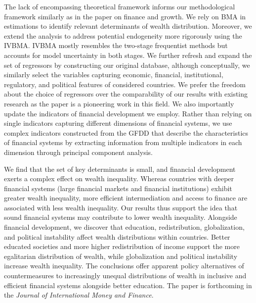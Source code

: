 \begin{refsection}
The lack of encompassing theoretical framework informs our methodological framework similarly as in the paper on finance and growth. We rely on \ac{BMA} in estimations to identify relevant determinants of wealth distribution. Moreover, we extend the analysis to address potential endogeneity more rigorously using the \ac{IVBMA}. \ac{IVBMA} mostly resembles the two-stage frequentist methods but accounts for model uncertainty in both stages. We further refresh and expand the set of regressors by constructing our original database, although conceptually, we similarly select the variables capturing economic, financial, institutional, regulatory, and political features of considered countries. We prefer the freedom about the choice of regressors over the comparability of our results with existing research as the paper is a pioneering work in this field. We also importantly update the indicators of financial development we employ. Rather than relying on single indicators capturing different dimensions of financial systems, we use complex indicators constructed from the \ac{GFDD} that describe the characteristics of financial systems by extracting information from multiple indicators in each dimension through principal component analysis.

We find that the set of key determinants is small, and financial development exerts a complex effect on wealth inequality. Whereas countries with deeper financial systems (large financial markets and financial institutions) exhibit greater wealth inequality, more efficient intermediation and access to finance are associated with less wealth inequality. Our results thus support the idea that sound financial systems may contribute to lower wealth inequality. Alongside financial development, we discover that education, redistribution, globalization, and political instability affect wealth distributions within countries. Better educated societies and more higher redistribution of income support the more egalitarian distribution of wealth, while globalization and political instability increase wealth inequality. The conclusions offer apparent policy alternatives of countermeasures to increasingly unequal distributions of wealth in inclusive and efficient financial systems alongside better education. The paper is forthcoming in the \emph{Journal of International Money and Finance}.


\end{refsection}

